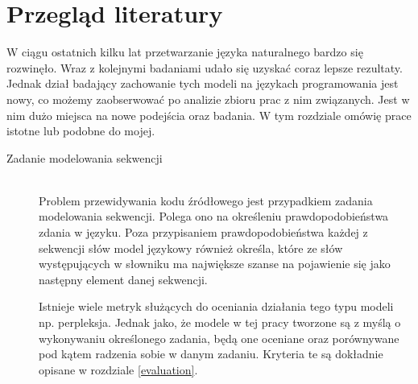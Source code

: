 \newpage %
\section{Przegląd literatury}
W ciągu ostatnich kilku lat przetwarzanie języka naturalnego bardzo się rozwinęło. Wraz z kolejnymi 
badaniami udało się uzyskać coraz lepsze rezultaty. Jednak dział badający zachowanie tych modeli 
na językach programowania jest nowy, co możemy zaobserwować po analizie zbioru prac \cite{ml4code}
z nim związanych. Jest w nim dużo miejsca na nowe podejścia oraz badania. W tym rozdziale omówię 
prace istotne lub podobne do mojej.  

\begin{description}
\item[Zadanie modelowania sekwencji]
\hfill\\
Problem przewidywania kodu źródłowego jest przypadkiem zadania modelowania sekwencji. Polega ono na określeniu 
prawdopodobieństwa zdania w języku. Poza przypisaniem prawdopodobieństwa każdej z sekwencji słów model językowy 
również określa, które ze słów występujących w słowniku ma największe szanse na pojawienie się jako następny element
danej sekwencji. 

Istnieje wiele metryk służących do oceniania działania tego typu modeli np. perpleksja. Jednak jako, że modele w tej
pracy tworzone są z myślą o wykonywaniu określonego zadania, będą one oceniane oraz porównywane pod kątem radzenia 
sobie w danym zadaniu. Kryteria te są dokładnie opisane w rozdziale \ref{evaluation}. 
\end{description}

